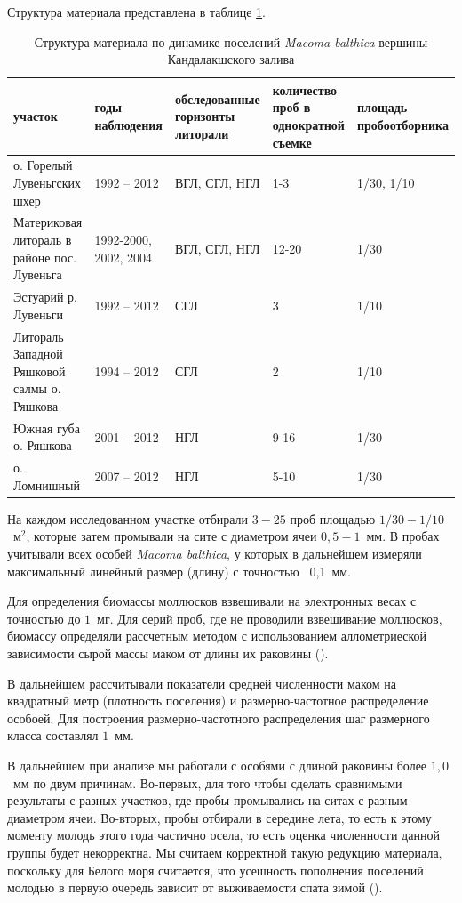 Структура материала представлена в таблице \ref{tab:material_Kandalaksha}.
\begin{table}[p]
\caption{Структура материала по динамике поселений {\it Macoma balthica} вершины Кандалакшского залива}
\label{tab:material_Kandalaksha}
    \begin{tabularx}{\textwidth}{|*{5}{X|}} \hline
участок & годы наблюдения & обследованные горизонты литорали & количество проб в однократной съемке & площадь пробоотборника  \\ \hline
о. Горелый Лувеньгских шхер & 1992 -- 2012 & ВГЛ, СГЛ, НГЛ & 1-3 & 1/30, 1/10 \\ \hline
Материковая литораль в районе пос. Лувеньга & 1992-2000, 2002, 2004 & ВГЛ, СГЛ, НГЛ & 12-20 & 1/30 \\ \hline
Эстуарий р. Лувеньги & 1992 -- 2012 & СГЛ & 3 & 1/10 \\ \hline
Литораль Западной Ряшковой салмы о. Ряшкова & 1994 -- 2012 & СГЛ & 2 & 1/10 \\ \hline
Южная губа о. Ряшкова & 2001 -- 2012 & НГЛ & 9-16 & 1/30 \\ \hline
о. Ломнишный & 2007 -- 2012 & НГЛ & 5-10 & 1/30  \\ \hline
\end{tabularx}
\end{table}

На каждом исследованном участке отбирали $3 - 25$ проб площадью $1/30 - 1/10$~м$^2$, которые затем промывали на сите с диаметром ячеи $0,5 - 1$~мм. 
В пробах учитывали всех особей {\it Macoma balthica}, у которых в дальнейшем измеряли максимальный линейный размер (длину) с точностью ~0,1~мм. 

Для определения биомассы моллюсков взвешивали на электронных весах с точностью до $1$~мг. 
Для серий проб, где не проводили взвешивание моллюсков, биомассу определяли рассчетным методом с использованием аллометриеской зависимости сырой массы маком от длины их раковины (\cite{Maximovich_et_al_1993}). 

В дальнейшем рассчитывали показатели средней численности маком на квадратный метр (плотность поселения) и размерно-частотное распределение особоей.
Для построения размерно-частотного распределения шаг размерного класса составлял $1$~мм.

В дальнейшем при анализе мы работали с особями с длиной раковины более $1,0$~мм по двум причинам. 
Во-первых, для того чтобы сделать сравнимыми результаты с разных участков, где пробы промывались на ситах с разным диаметром ячеи. 
Во-вторых, пробы отбирали в середине лета, то есть к этому моменту молодь этого года частично осела, то есть оценка численности данной группы будет некорректна.
Мы считаем корректной такую редукцию материала, поскольку для Белого моря считается, что усешность пополнения поселений молодью в первую очередь зависит от выживаемости спата зимой (\cite{Maximovich_Gerasimova_2004}).

